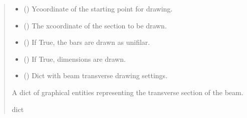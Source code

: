 \documentclass[a4paper,10pt,english]{sphinxmanual}
\begin{document}
\begin{fulllineitems}
\begin{fulllineitems}
\begin{quote}
\begin{description}
\begin{itemize}
\item {} 
\sphinxAtStartPar
{} () \textendash{} Y\sphinxhyphen{}coordinate of the starting point for drawing.

\item {} 
\sphinxAtStartPar
{} (\sphinxstyleliteralemphasis{\sphinxupquote{, }}) \textendash{} The x\sphinxhyphen{}coordinate of the section to be drawn.

\item {} 
\sphinxAtStartPar
{} () \textendash{} If True, the bars are drawn as unifilar.

\item {} 
\sphinxAtStartPar
{} () \textendash{} If True, dimensions are drawn.

\item {} 
\sphinxAtStartPar
{} () \textendash{} Dict with beam transverse drawing settings.

\end{itemize}

\sphinxAtStartPar
A dict of graphical entities representing the transverse section of the beam.

\sphinxAtStartPar
dict

\end{description}\end{quote}

\end{fulllineitems}



\end{fulllineitems}
\end{document}
